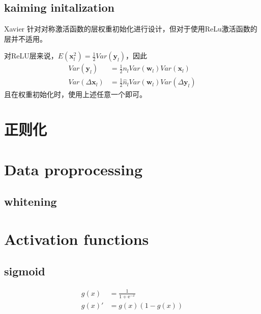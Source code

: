 \subsection{kaiming initalization}
Xavier 针对对称激活函数的层权重初始化进行设计，但对于使用ReLu激活函数的层并不适用\cite{He2015}。
\par
对ReLU层来说，$E(\mathbf{x}_l^2) = \frac{1}{2}Var(\mathbf{y}_l)$，因此
\begin{equation}
    \begin{split}
        Var(\mathbf{y}_l) &= \frac{1}{2} n_l Var(\mathbf{w}_l)Var(\mathbf{x}_l) \\
        Var(\Delta{\mathbf{x}_l}) &= \frac{1}{2} \hat n_l Var(\mathbf{w}_l)Var(\Delta{\mathbf{y}}_l)
    \end{split}
\end{equation}
且在权重初始化时，使用上述任意一个即可。

\section{正则化}

\section{Data proprocessing}
\subsection{whitening}

\section{Activation functions}
\subsection{sigmoid}

\begin{equation}
    \begin{split}
        g(x) &= \frac{1}{1+\mathrm{e}^{-x}} \\
        g(x)' &= g(x)(1-g(x))
    \end{split}
\end{equation}

